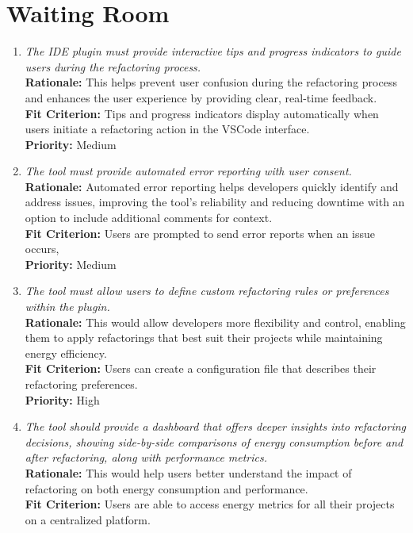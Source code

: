 \documentclass[12pt]{article}
\begin{document}
\section{Waiting Room}
\begin{enumerate}[label=WTRM \arabic*., wide=0pt, leftmargin=*]
	\item \emph{The IDE plugin must provide interactive tips and progress indicators to guide users during the refactoring process.}\\[2mm]
    {\bf Rationale:} This helps prevent user confusion during the refactoring process and enhances the user experience by providing clear, real-time feedback.\\
    {\bf Fit Criterion:} Tips and progress indicators display automatically when users initiate a refactoring action in the VSCode interface.\\
    {\bf Priority:} Medium
  \item \emph{The tool must provide automated error reporting with user consent.}\\[2mm]
    {\bf Rationale:} Automated error reporting helps developers quickly identify and address issues, improving the tool's reliability and reducing downtime with an option to include additional comments for context.\\
    {\bf Fit Criterion:} Users are prompted to send error reports when an issue occurs, \\
    {\bf Priority:} Medium
  \item \emph{The tool must allow users to define custom refactoring rules or preferences within the plugin.}\\[2mm]
    {\bf Rationale:} This would allow developers more flexibility and control, enabling them to apply refactorings that best suit their projects while maintaining energy efficiency.\\
    {\bf Fit Criterion:} Users can create a configuration file that describes their refactoring preferences.\\
    {\bf Priority:} High
  \item \emph{The tool should provide a dashboard that offers deeper insights into refactoring decisions, showing side-by-side comparisons of energy consumption before and after refactoring, along with performance metrics.}\\[2mm]
    {\bf Rationale:} This would help users better understand the impact of refactoring on both energy consumption and performance.\\
    {\bf Fit Criterion:} Users are able to access energy metrics for all their projects on a centralized platform.\\

\end{enumerate}
\end{document}
